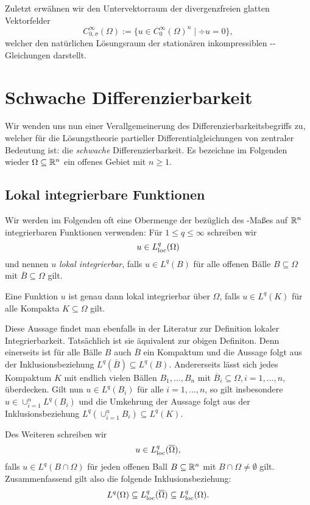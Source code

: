 Zuletzt erwähnen wir den Untervektorraum der divergenzfreien glatten Vektorfelder
$$
C_{0,\sigma}^\infty(\Omega) := \{u \in C_0^\infty(\Omega)^n \mid \div u = 0\},
$$
 welcher den natürlichen Lösungsraum der stationären inkompressiblen \navier\hyp{}\stokes\hyp{}Gleichungen darstellt.

\section{Schwache Differenzierbarkeit}
\label{subsec:distributionsSobolev}

Wir wenden uns nun einer Verallgemeinerung des Differenzierbarkeitsbegriffs zu, welcher für die Lösungstheorie partieller Differentialgleichungen von zentraler Bedeutung ist: die \emph{schwache} Differenzierbarkeit.
Es bezeichne im Folgenden wieder $\Omega \subseteq \mathbb{R}^n$ ein offenes Gebiet mit $n \geq 1$.

\subsection{Lokal integrierbare Funktionen}

Wir werden im Folgenden oft eine Obermenge der bezüglich des \lebesgue\hyp{}Maßes auf $\mathbb{R}^n$ integrierbaren Funktionen verwenden:
Für $1 \leq q \leq \infty$ schreiben wir
$$
  u \in L^q_{\operatorname{loc}}(\Omega)
$$
und nennen $u$ \emph{lokal integrierbar}, falls $u \in L^q(B)$ für alle offenen Bälle $B \subseteq \Omega$ mit $\overline B \subseteq \Omega$ gilt.

\begin{bem}
  Eine Funktion $u$ ist genau dann lokal integrierbar über $\Omega$, falls $u \in L^q(K)$ für alle Kompakta $K \subseteq \Omega$ gilt.

  Diese Aussage findet man ebenfalls in der Literatur zur Definition lokaler Integrierbarkeit.
  Tatsächlich ist sie äquivalent zur obigen Definiton.
  Denn einerseits ist für alle Bälle $B$ auch $\overline B$ ein Kompaktum und die Aussage folgt aus der Inklusionsbeziehung $L^q(\overline B) \subseteq L^q(B)$.
  Andererseits lässt sich jedes Kompaktum $K$ mit endlich vielen Bällen $B_1, \dots, B_n$ mit $\overline B_i \subseteq \Omega, i =1,\dots,n,$ überdecken. 
  Gilt nun $u \in L^q(B_i)$ für alle $i = 1, \dots, n$, so gilt insbesondere $u \in \cup_{i = 1}^n L^q(B_i)$ und die Umkehrung der Aussage folgt aus der Inklusionsbeziehung $L^q(\cup_{i = 1}^n B_i) \subseteq L^q(K)$.
\end{bem}

Des Weiteren schreiben wir
$$
u \in L^q_{\operatorname{loc}}(\overline\Omega),
$$
falls $u \in L^q(B \cap \Omega)$ für jeden offenen Ball $B \subseteq \mathbb{R}^n$ mit $B \cap \Omega \neq \emptyset$ gilt.
Zusammenfassend gilt also die folgende Inklusionsbeziehung:
$$
L^q(\Omega) \subseteq L^q_{\operatorname{loc}}(\overline\Omega) \subseteq L^q_{\operatorname{loc}}(\Omega).
$$

